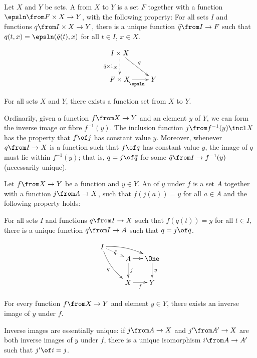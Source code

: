 \documentclass[12pt]{article}
\begin{document}
\begin{dfn}
Let $X$ and $Y$ be sets.  A  from $X$ to $Y$ is a
set $F$ together with a function $\epsln\from F \times X \to Y$, with the
following property: 
% 
\medskip\noindent
For all sets $I$ and functions $q\from I \times X \to Y$,
there is a unique function $\bar{q}\from I \to F$
such that 
$q(t, x) = \epsln (\bar{q}(t), x)$ for all $t \in I$, $x \in X$.
\end{dfn}
\[
\xymatrix{
I \times X \ar@{.>}[d]_{\bar{q} \times 1_X} \ar[rd]^q   &       \\
F \times X \ar[r]_\epsln                                &Y
}
\]
% 
\begin{axiom}
For all sets $X$ and $Y$, there exists a function set from $X$ to $Y$.
\end{axiom}


% 
Ordinarily, given a function $f\from X \to Y$ and an element $y$ of $Y$, we
can form the inverse image or fibre $f^{-1}(y)$.  The inclusion function $j
\from f^{-1}(y) \incl X$ has the property that $f\of j$ has constant value
$y$.  Moreover, whenever $q \from I \to X$ is a function such that $f \of
q$ has constant value $y$, the image of $q$ must lie within $f^{-1}(y)$;
that is, $q = j \of \bar{q}$ for some $\bar{q}\from I \to f^{-1}(y)$
(necessarily unique).

\begin{dfn}
Let $f\from X \to Y$ be a function and $y \in Y$.  An 
of $y$ under $f$ is a set $A$ together with a function $j\from A \to X$, such
that $f(j(a)) = y$ for all $a \in A$ and the following property holds:

\medskip\noindent
For all sets $I$ and functions $q \from I \to X$ such that
$f(q(t)) = y$ for all $t \in I$,
there is a unique function $\bar{q} \from I \to A$
such that $q = j \of \bar{q}$.  
\end{dfn}
\[
\begin{xy}
(0,12)*+{A}="inv";
(12,12)*+{\One}="one";
(0,0)*+{X}="dom";
(12,0)*+{Y}="cod";
(-13,18)*+{I}="test";
{\ar^j "inv"; "dom"};
{\ar "inv"; "one"};
{\ar_f "dom"; "cod"};
{\ar^y "one"; "cod"};
{\ar@/_/_{q} "test"; "dom"};
{\ar@/^/ "test"; "one"};
{\ar@{.>}|{\bar{q}} "test"; "inv"};
\end{xy}
\]

\begin{axiom}
For every function $f\from X \to Y$ and element $y \in Y$, there exists an
inverse image of $y$ under $f$.
\end{axiom}
Inverse images are essentially unique: if $j\from A \to X$ and
$j'\from A' \to X$ are both inverse images of $y$ under $f$, there is a
unique isomorphism $i \from A \to A'$ such that $j' \of i = j$. 
\end{document}
